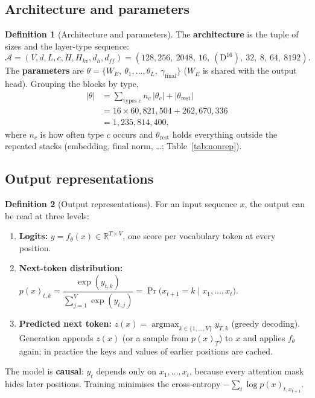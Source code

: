 \documentclass[10pt,a4paper]{article}
\theoremstyle{definition}
\newtheorem{definition}{Definition}[section]
\begin{document}
\subsection{Architecture and parameters}
\begin{definition}[Architecture and parameters]
The \textbf{architecture} is the tuple of sizes and the layer-type sequence:
\begin{equation}
  \mathcal{A} = (V,d,L,c,H,H_{kv},d_h,d_{ff}) = (128{,}256,\ 2048,\ 16,\ (\mathrm{D}^{16}),\ 32,\ 8,\ 64,\ 8192).
\end{equation}
The \textbf{parameters} are $\theta=\{W_E,\ \theta_1,\dots,\theta_L,\ \gamma_{\mathrm{final}}\}$ ($W_E$ is shared with the output head). Grouping the blocks by type,
\begin{align*}
  |\theta| &= \sum_{\text{types } c} n_c\,|\theta_c| + |\theta_{\mathrm{rest}}| \\
  &= 16\times60{,}821{,}504 + 262{,}670{,}336 \\
  &= 1{,}235{,}814{,}400,
\end{align*}
where $n_c$ is how often type $c$ occurs and $\theta_{\mathrm{rest}}$ holds everything outside the repeated stacks (embedding, final norm, \dots; Table~\ref{tab:nonrep}).
\end{definition}
\subsection{Output representations}
\begin{definition}[Output representations]
For an input sequence $x$, the output can be read at three levels:
\begin{enumerate}
\item \textbf{Logits:} $y=f_\theta(x)\in\mathbb{R}^{T\times V}$, one score per vocabulary token at every position.
\item \textbf{Next-token distribution:} $p(x)_{t,k}=\dfrac{\exp(y_{t,k})}{\sum_{j=1}^{V}\exp(y_{t,j})}=\Pr\big(x_{t+1}=k\mid x_{1},\dots,x_{t}\big)$.
\item \textbf{Predicted next token:} $z(x)=\operatorname{argmax}_{k\in\{1,\dots,V\}} y_{T,k}$ (greedy decoding). Generation appends $z(x)$ (or a sample from $p(x)_{T}$) to $x$ and applies $f_\theta$ again; in practice the keys and values of earlier positions are cached.
\end{enumerate}
The model is \textbf{causal}: $y_t$ depends only on $x_1,\dots,x_t$, because every attention mask hides later positions. Training minimises the cross-entropy $-\sum_{t}\log p(x)_{t,x_{t+1}}$.
\end{definition}
\end{document}
